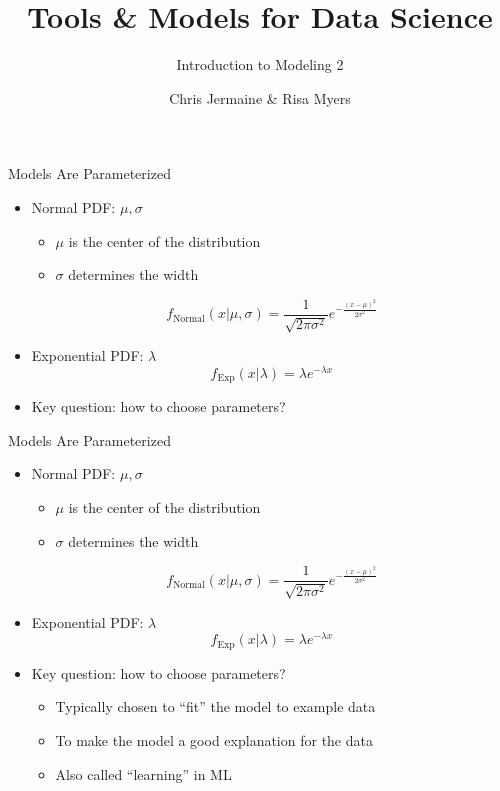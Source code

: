\documentclass[aspectratio=169]{beamer}
\title[]
{Tools \& Models for Data Science}
\subtitle{Introduction to Modeling 2}
\author[]{Chris Jermaine \& Risa Myers}
\institute
{
  Rice University 
}
\date[]{}
\begin{document}
\begin{frame}
 \titlepage
\end{frame}

\begin{frame}{Models Are Parameterized}

\begin{itemize}
\item Normal PDF: $\mu, \sigma$
\begin{itemize}
\item $\mu$ is the center of the distribution
\item $\sigma$ determines the width
\end{itemize}
$$f_{\textrm{Normal}}(x | \mu, \sigma) = \frac{1}{\sqrt{2\pi\sigma^2}}
                e^{-\frac{(x - \mu)^2}{2\sigma^{2}}}$$
\item Exponential PDF: $\lambda$
$$f_{\textrm{Exp}} (x | \lambda) = \lambda e^{-\lambda x}$$
\item Key question: how to choose parameters?
\end{itemize}
\end{frame}
\begin{frame}{Models Are Parameterized}

\begin{itemize}
\item Normal PDF: $\mu, \sigma$
\begin{itemize}
\item $\mu$ is the center of the distribution
\item $\sigma$ determines the width
\end{itemize}
$$f_{\textrm{Normal}}(x | \mu, \sigma) = \frac{1}{\sqrt{2\pi\sigma^2}}
                e^{-\frac{(x - \mu)^2}{2\sigma^{2}}}$$
\item Exponential PDF: $\lambda$
$$f_{\textrm{Exp}} (x | \lambda) = \lambda e^{-\lambda x}$$
\item Key question: how to choose parameters?
\begin{itemize}
	\item Typically chosen to ``fit'' the model to example data
	\item To make the model a good explanation for the data
	\item Also called ``learning'' in ML
\end{itemize}
\end{itemize}

\end{frame}
\end{document}

